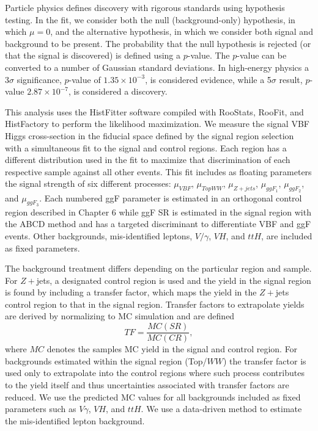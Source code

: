 Particle physics defines discovery with rigorous standards using hypothesis testing. In the fit, we consider both the null (background-only) hypothesis, in which $\mu=0$, and the alternative hypothesis, in which we consider both signal and background to be present. The probability that the null hypothesis is rejected (or that the signal is discovered) is defined using a $p$-value. The $p$-value can be converted to a number of Gaussian standard deviations. In high-energy physics a 3$\sigma$ significance, $p$-value of $1.35 \times 10^{-3}$, is considered evidence, while a 5$\sigma$ result, $p$-value $2.87\times10^{-7}$, is considered a discovery.

This analysis uses the HistFitter software compiled with RooStats, RooFit, and HistFactory to perform the likelihood maximization. We measure the signal VBF Higgs cross-section in the fiducial space defined by the signal region selection with a simultaneous fit to the signal and control regions. Each region has a different distribution used in the fit to maximize that discrimination of each respective sample against all other events. This fit includes as floating parameters the signal strength of six different processes: $\mu_{VBF}$, $\mu_{TopWW}$, $\mu_{Z+jets}$, $\mu_{ggF_1}$, $\mu_{ggF_2}$, and $\mu_{ggF_3}$. Each numbered ggF parameter is estimated in an orthogonal control region described in Chapter 6 while ggF SR is estimated in the signal region with the ABCD method and has a targeted discriminant to differentiate VBF and ggF events. Other backgrounds, mis-identified leptons, $V/\gamma$, $VH$, and $ttH$, are included as fixed parameters. 

The background treatment differs depending on the particular region and sample. For $Z+$jets, a designated control region is used and the yield in the signal region is found by including a transfer factor, which maps the yield in the $Z+$jets control region to that in the signal region. Transfer factors to extrapolate yields are derived by normalizing to MC simulation and are defined
\begin{equation}
TF = \frac{MC(SR)}{MC(CR)},
\end{equation}
where $MC$ denotes the samples MC yield in the signal and control region. For backgrounds estimated within the signal region (Top/$WW$) the transfer factor is used only to extrapolate into the control regions where such process contributes to the yield itself and thus uncertainties associated with transfer factors are reduced. We use the predicted MC values for all backgrounds included as fixed parameters such as $V\gamma$, $VH$, and $ttH$. We use a data-driven method to estimate the mis-identified lepton background. 

